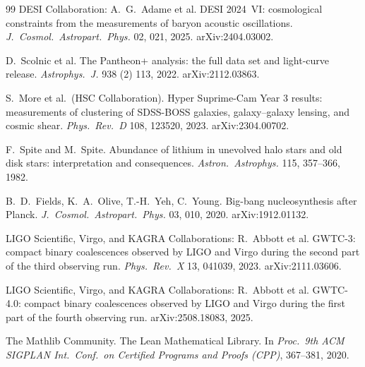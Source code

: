 \documentclass[11pt,a4paper]{amsart}
\theoremstyle{plain}
\theoremstyle{definition}
\begin{document}
\begin{thebibliography}{99}
DESI Collaboration: A.~G.~Adame et al.
\newblock DESI 2024~VI: cosmological constraints from the measurements of baryon acoustic oscillations.
\newblock \emph{J.\ Cosmol.\ Astropart.\ Phys.} 02, 021, 2025. arXiv:2404.03002.

D.~Scolnic et al.
\newblock The Pantheon+ analysis: the full data set and light-curve release.
\newblock \emph{Astrophys.\ J.} 938 (2) 113, 2022. arXiv:2112.03863.

S.~More et al.\ (HSC Collaboration).
\newblock Hyper Suprime-Cam Year 3 results: measurements of clustering of SDSS-BOSS galaxies, galaxy--galaxy lensing, and cosmic shear.
\newblock \emph{Phys.\ Rev.\ D} 108, 123520, 2023. arXiv:2304.00702.

F.~Spite and M.~Spite.
\newblock Abundance of lithium in unevolved halo stars and old disk stars: interpretation and consequences.
\newblock \emph{Astron.\ Astrophys.} 115, 357--366, 1982.

B.~D.~Fields, K.~A.~Olive, T.-H.~Yeh, C.~Young.
\newblock Big-bang nucleosynthesis after Planck.
\newblock \emph{J.\ Cosmol.\ Astropart.\ Phys.} 03, 010, 2020. arXiv:1912.01132.

LIGO Scientific, Virgo, and KAGRA Collaborations: R.~Abbott et al.
\newblock GWTC-3: compact binary coalescences observed by LIGO and Virgo during the second part of the third observing run.
\newblock \emph{Phys.\ Rev.\ X} 13, 041039, 2023. arXiv:2111.03606.

LIGO Scientific, Virgo, and KAGRA Collaborations: R.~Abbott et al.
\newblock GWTC-4.0: compact binary coalescences observed by LIGO and Virgo during the first part of the fourth observing run.
\newblock arXiv:2508.18083, 2025.

The Mathlib Community.
\newblock The Lean Mathematical Library.
\newblock In \emph{Proc.\ 9th ACM SIGPLAN Int.\ Conf.\ on Certified Programs and Proofs (CPP)}, 367--381, 2020.

\end{thebibliography}
\end{document}
